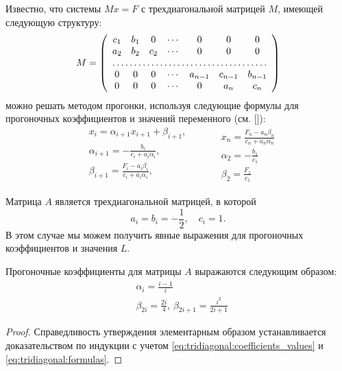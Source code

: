 Известно, что системы $ Mx = F $ с трехдиагональной матрицей $ M $, имеющей следующую структуру:
\[
M = \left(\begin{array}{ccccccc}
c_1 & b_1 & 0 & \cdots & 0 & 0 & 0 \\
a_2 & b_2 & c_2 & \cdots & 0 & 0 & 0 \\
\hdotsfor{7} \\
0 & 0 & 0 & \cdots & a_{n-1} & c_{n-1} & b_{n-1} \\
0 & 0 & 0 & \cdots & 0 & a_n & c_n
\end{array}\right)
\]
можно решать методом прогонки, используя следующие формулы для прогоночных коэффициентов и значений переменного (см. [\samarsky]):
\begin{equation}
\label{eq:tridiagonal:formulas}
\begin{split}
    &x_i = \alpha_{i+1} x_{i+1} + \beta_{i+1}, \\
    &\alpha_{i+1} = -\frac{b_i}{c_i + a_i\alpha_i}, \\
    &\beta_{i+1} = \frac{F_i - a_i\beta_i}{c_i + a_i\alpha_i}, \\
\end{split}
\qquad
\begin{split}
    &x_n = \frac{F_n - a_n\beta_n}{c_n + a_n\alpha_n} \\
    &\alpha_2 = -\frac{b_1}{c_1} \\
    &\beta_2 = \frac{F_1}{c_1}
\end{split}
\end{equation}

Матрица $ A $ является трехдиагональной матрицей, в которой 
\begin{equation}
\label{eq:tridiagonal:coefficients_values}
a_i = b_i = -\frac{1}{2}, \quad c_i = 1.
\end{equation}
В этом случае мы можем получить явные выражения для прогоночных коэффициентов и значения $ L $.

\begin{utver}
\label{utver:tridiagonal:coefficients}
Прогоночные коэффициенты для матрицы $ A $ выражаются следующим образом:
\begin{align}
\label{eq:tridiagonal:alpha}
&\alpha_i = \frac{i-1}{i} \\
\label{eq:tridiagonal:beta}
&\beta_{2i} = \frac{2i}{4}, \,
\beta_{2i+1} = \frac{i^2}{2i+1}
\end{align}
\end{utver}
\begin{proof}
Справедливость утверждения элементарным образом устанавливается доказательством по индукции с учетом \eqref{eq:tridiagonal:coefficients_values} и \eqref{eq:tridiagonal:formulas}.
\end{proof}

